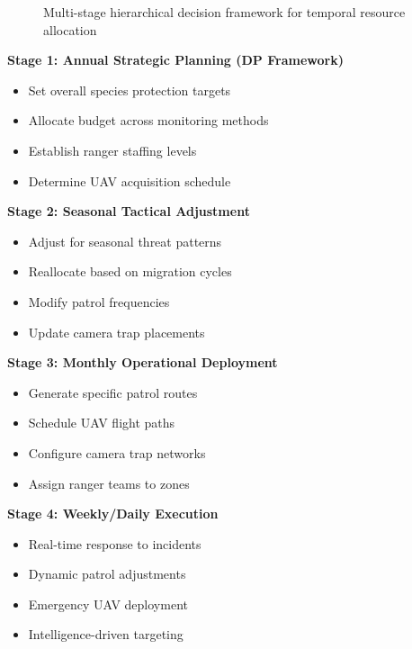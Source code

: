 \begin{figure}[h]
\caption{Multi-stage hierarchical decision framework for temporal resource allocation}
\end{figure}

\textbf{Stage 1: Annual Strategic Planning (DP Framework)}
\begin{itemize}
    \item Set overall species protection targets
    \item Allocate budget across monitoring methods
    \item Establish ranger staffing levels
    \item Determine UAV acquisition schedule
\end{itemize}

\textbf{Stage 2: Seasonal Tactical Adjustment}
\begin{itemize}
    \item Adjust for seasonal threat patterns
    \item Reallocate based on migration cycles
    \item Modify patrol frequencies
    \item Update camera trap placements
\end{itemize}

\textbf{Stage 3: Monthly Operational Deployment}
\begin{itemize}
    \item Generate specific patrol routes
    \item Schedule UAV flight paths
    \item Configure camera trap networks
    \item Assign ranger teams to zones
\end{itemize}

\textbf{Stage 4: Weekly/Daily Execution}
\begin{itemize}
    \item Real-time response to incidents
    \item Dynamic patrol adjustments
    \item Emergency UAV deployment
    \item Intelligence-driven targeting
\end{itemize}

